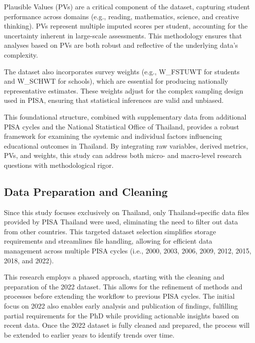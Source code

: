 \documentclass[
]{article}
\begin{document}
Plausible Values (PVs) are a critical component of the dataset,
capturing student performance across domains (e.g., reading,
mathematics, science, and creative thinking). PVs represent multiple
imputed scores per student, accounting for the uncertainty inherent in
large-scale assessments. This methodology ensures that analyses based on
PVs are both robust and reflective of the underlying data's complexity.

The dataset also incorporates survey weights (e.g., W\_FSTUWT for
students and W\_SCHWT for schools), which are essential for producing
nationally representative estimates. These weights adjust for the
complex sampling design used in PISA, ensuring that statistical
inferences are valid and unbiased.

This foundational structure, combined with supplementary data from
additional PISA cycles and the National Statistical Office of Thailand,
provides a robust framework for examining the systemic and individual
factors influencing educational outcomes in Thailand. By integrating raw
variables, derived metrics, PVs, and weights, this study can address
both micro- and macro-level research questions with methodological
rigor.

\hypertarget{data-preparation-and-cleaning}{%
\subsection{Data Preparation and
Cleaning}\label{data-preparation-and-cleaning}}

Since this study focuses exclusively on Thailand, only Thailand-specific
data files provided by PISA Thailand were used, eliminating the need to
filter out data from other countries. This targeted dataset selection
simplifies storage requirements and streamlines file handling, allowing
for efficient data management across multiple PISA cycles (i.e., 2000,
2003, 2006, 2009, 2012, 2015, 2018, and 2022).

This research employs a phased approach, starting with the cleaning and
preparation of the 2022 dataset. This allows for the refinement of
methods and processes before extending the workflow to previous PISA
cycles. The initial focus on 2022 also enables early analysis and
publication of findings, fulfilling partial requirements for the PhD
while providing actionable insights based on recent data. Once the 2022
dataset is fully cleaned and prepared, the process will be extended to
earlier years to identify trends over time.
\end{document}
